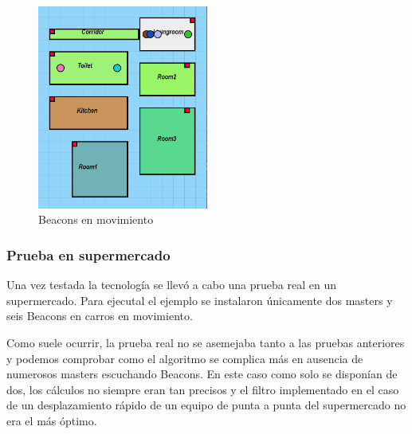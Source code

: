 \documentclass[paper=a4, fontsize=11pt,twoside]{scrartcl}
\begin{document}
            \begin{center}
                \begin{figure}[]
                    \centering
                    \includegraphics[width=0.5\textwidth]{../../Memmory/images/house_simulation_3.PNG}
                    \caption{Beacons en movimiento}
                    \label{fig:mesh18}
                \end{figure}
            \end{center}   
        \subsubsection{Prueba en supermercado}
        Una vez testada la tecnología se llevó a cabo una prueba real en un supermercado. Para ejecutal el ejemplo
        se instalaron únicamente dos masters y seis Beacons en carros en movimiento.
        
        Como suele ocurrir, la prueba real no se asemejaba tanto a las pruebas anteriores y podemos comprobar como 
        el algoritmo se complica más en ausencia de numerosos masters escuchando Beacons. En este caso como solo se disponían
        de dos, los cálculos no siempre eran tan precisos y el filtro implementado en el caso de un desplazamiento rápido de un 
        equipo de punta a punta del supermercado no era el más óptimo.
        
\end{document}
